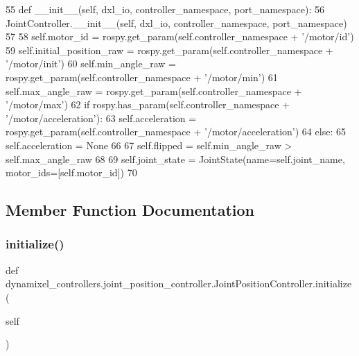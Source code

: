 \begin{DoxyCode}
55     \textcolor{keyword}{def }\_\_init\_\_(self, dxl\_io, controller\_namespace, port\_namespace):
56         JointController.\_\_init\_\_(self, dxl\_io, controller\_namespace, port\_namespace)
57         
58         self.motor\_id = rospy.get\_param(self.controller\_namespace + \textcolor{stringliteral}{'/motor/id'})
59         self.initial\_position\_raw = rospy.get\_param(self.controller\_namespace + \textcolor{stringliteral}{'/motor/init'})
60         self.min\_angle\_raw = rospy.get\_param(self.controller\_namespace + \textcolor{stringliteral}{'/motor/min'})
61         self.max\_angle\_raw = rospy.get\_param(self.controller\_namespace + \textcolor{stringliteral}{'/motor/max'})
62         \textcolor{keywordflow}{if} rospy.has\_param(self.controller\_namespace + \textcolor{stringliteral}{'/motor/acceleration'}):
63             self.acceleration = rospy.get\_param(self.controller\_namespace + \textcolor{stringliteral}{'/motor/acceleration'})
64         \textcolor{keywordflow}{else}:
65             self.acceleration = \textcolor{keywordtype}{None}
66         
67         self.flipped = self.min\_angle\_raw > self.max\_angle\_raw
68         
69         self.joint\_state = JointState(name=self.joint\_name, motor\_ids=[self.motor\_id])
70 
\end{DoxyCode}


\subsection{Member Function Documentation}
\mbox{\label{classdynamixel__controllers_1_1joint__position__controller_1_1_joint_position_controller_af5eef7a725f62cec172e820e4351ef5b}} 
\subsubsection{\texorpdfstring{initialize()}{initialize()}}
{\footnotesize\ttfamily def dynamixel\+\_\+controllers.\+joint\+\_\+position\+\_\+controller.\+Joint\+Position\+Controller.\+initialize (\begin{DoxyParamCaption}\item[{}]{self }\end{DoxyParamCaption})}



